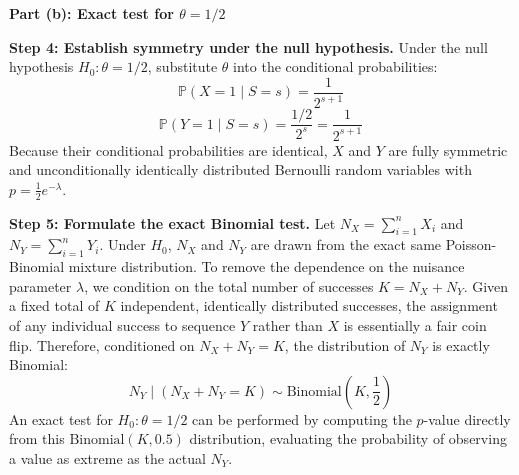 \begin{solution}
\textbf{Part (b): Exact test for $\theta = 1/2$}

\textbf{Step 4: Establish symmetry under the null hypothesis.}
Under the null hypothesis $H_0: \theta = 1/2$, substitute $\theta$ into the conditional probabilities:
\[ \mathbb{P}(X=1 \mid S=s) = \frac{1}{2^{s+1}} \]
\[ \mathbb{P}(Y=1 \mid S=s) = \frac{1/2}{2^s} = \frac{1}{2^{s+1}} \]
Because their conditional probabilities are identical, $X$ and $Y$ are fully symmetric and unconditionally identically distributed Bernoulli random variables with $p = \frac{1}{2} e^{-\lambda}$.

\textbf{Step 5: Formulate the exact Binomial test.}
Let $N_X = \sum_{i=1}^n X_i$ and $N_Y = \sum_{i=1}^n Y_i$. Under $H_0$, $N_X$ and $N_Y$ are drawn from the exact same Poisson-Binomial mixture distribution.
To remove the dependence on the nuisance parameter $\lambda$, we condition on the total number of successes $K = N_X + N_Y$.
Given a fixed total of $K$ independent, identically distributed successes, the assignment of any individual success to sequence $Y$ rather than $X$ is essentially a fair coin flip.
Therefore, conditioned on $N_X + N_Y = K$, the distribution of $N_Y$ is exactly Binomial:
\[ N_Y \mid (N_X + N_Y = K) \sim \text{Binomial}\left(K, \frac{1}{2}\right) \]
An exact test for $H_0: \theta = 1/2$ can be performed by computing the $p$-value directly from this $\text{Binomial}(K, 0.5)$ distribution, evaluating the probability of observing a value as extreme as the actual $N_Y$.
\end{solution}
